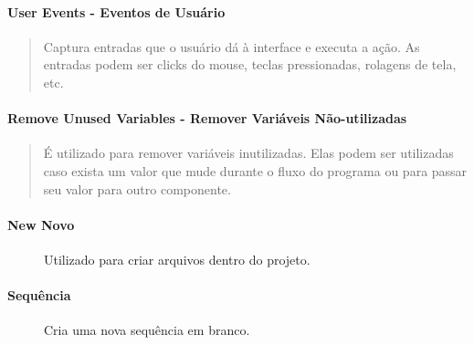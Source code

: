 \documentclass[letterpaper,10pt,brazil]{sphinxmanual}
\begin{document}
\noindent{}


\paragraph{User Events - Eventos de Usuário}
\label{\detokenize{interface_guide:user-events-eventos-de-usuario}}\begin{quote}

Captura entradas que o usuário dá à interface e executa a ação. As entradas podem ser clicks do mouse, teclas pressionadas, rolagens de tela, etc.
\end{quote}

\noindent{}


\paragraph{Remove Unused Variables - Remover Variáveis Não-utilizadas}
\label{\detokenize{interface_guide:remove-unused-variables-remover-variaveis-nao-utilizadas}}\begin{quote}

É utilizado para remover variáveis inutilizadas. Elas podem ser utilizadas caso exista um valor que mude durante o fluxo do programa ou para passar seu valor para outro componente.
\end{quote}

\noindent{}


\paragraph{New \textendash{} Novo}
\label{\detokenize{interface_guide:new-novo}}
\begin{figure}[htbp]
\centering
\capstart

\noindent{}
\caption{Utilizado para criar arquivos dentro do projeto.}\label{\detokenize{interface_guide:id1}}\end{figure}


\paragraph{Sequência}
\label{\detokenize{interface_guide:sequencia}}
\begin{figure}[htbp]
\centering
\capstart

\noindent{}
\caption{Cria uma nova sequência em branco.}\label{\detokenize{interface_guide:id2}}\end{figure}
\end{document}
